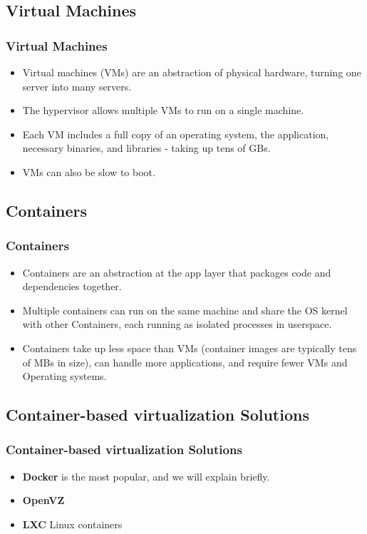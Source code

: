 \documentclass[t,28pt,aspectratio=169,usenames,dvipsnames]{beamer}
\begin{document}
\subsection{Virtual Machines}
\begin{frame}
    \frametitle{Virtual Machines}
    \begin{itemize}
        \item Virtual machines (VMs) are an abstraction of physical hardware, turning one server into many servers.
        \item The hypervisor allows multiple VMs to run on a single machine.
        \item Each VM includes a full copy of an operating system, the application, necessary binaries, and libraries - taking up tens of GBs.
        \item VMs can also be slow to boot.
    \end{itemize}
\end{frame}

\subsection{Containers}
\begin{frame}
    \frametitle{Containers}
    \begin{itemize}
        \item Containers are an abstraction at the app layer that packages code and dependencies together.
        \item Multiple containers can run on the same machine and share the OS kernel with other Containers, each running as isolated processes in userspace.
        \item Containers take up less space than VMs (container images are typically tens of MBs in size), can handle more applications, and require fewer VMs and Operating systems. 
    \end{itemize}
\end{frame}

\subsection{Container-based virtualization Solutions}
\begin{frame}
    \frametitle{Container-based virtualization Solutions}
    \begin{itemize}
        \item \textbf{Docker} is the most popular, and we will explain briefly.
        \item \textbf{OpenVZ}
        \item \textbf{LXC} Linux containers 
    \end{itemize}
\end{frame}
\end{document}
